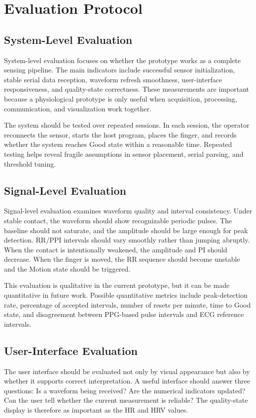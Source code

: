 \documentclass[10pt,conference]{IEEEtran}
\begin{document}
\section{Evaluation Protocol}
\subsection{System-Level Evaluation}
System-level evaluation focuses on whether the prototype works as a complete sensing pipeline. The main indicators include successful sensor initialization, stable serial data reception, waveform refresh smoothness, user-interface responsiveness, and quality-state correctness. These measurements are important because a physiological prototype is only useful when acquisition, processing, communication, and visualization work together.

The system should be tested over repeated sessions. In each session, the operator reconnects the sensor, starts the host program, places the finger, and records whether the system reaches Good state within a reasonable time. Repeated testing helps reveal fragile assumptions in sensor placement, serial parsing, and threshold tuning.

\subsection{Signal-Level Evaluation}
Signal-level evaluation examines waveform quality and interval consistency. Under stable contact, the waveform should show recognizable periodic pulses. The baseline should not saturate, and the amplitude should be large enough for peak detection. RR/PPI intervals should vary smoothly rather than jumping abruptly. When the contact is intentionally weakened, the amplitude and PI should decrease. When the finger is moved, the RR sequence should become unstable and the Motion state should be triggered.

This evaluation is qualitative in the current prototype, but it can be made quantitative in future work. Possible quantitative metrics include peak-detection rate, percentage of accepted intervals, number of resets per minute, time to Good state, and disagreement between PPG-based pulse intervals and ECG reference intervals.

\subsection{User-Interface Evaluation}
The user interface should be evaluated not only by visual appearance but also by whether it supports correct interpretation. A useful interface should answer three questions: Is a waveform being received? Are the numerical indicators updated? Can the user tell whether the current measurement is reliable? The quality-state display is therefore as important as the HR and HRV values.
\end{document}

